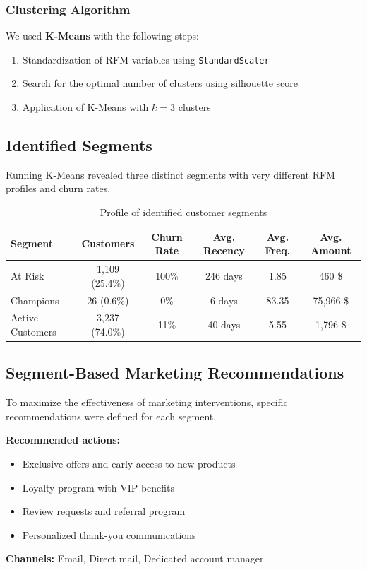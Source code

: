 \documentclass[12pt,a4paper]{article}
\begin{document}
\subsubsection{Clustering Algorithm}
We used \textbf{K-Means} with the following steps:
\begin{enumerate}
    \item Standardization of RFM variables using \texttt{StandardScaler}
    \item Search for the optimal number of clusters using silhouette score
    \item Application of K-Means with $k=3$ clusters
\end{enumerate}

\subsection{Identified Segments}

Running K-Means revealed three distinct segments with very different RFM profiles and churn rates.

\begin{table}[H]
\centering
\begin{tabular}{L{3cm}ccccc}
\toprule
\textbf{Segment} & \textbf{Customers} & \textbf{Churn Rate} & \textbf{Avg. Recency} & \textbf{Avg. Freq.} & \textbf{Avg. Amount} \\
\midrule
At Risk & 1,109 (25.4\%) & 100\% & 246 days & 1.85 & 460 \$ \\
Champions & 26 (0.6\%) & 0\% & 6 days & 83.35 & 75,966 \$ \\
Active Customers & 3,237 (74.0\%) & 11\% & 40 days & 5.55 & 1,796 \$ \\
\bottomrule
\end{tabular}
\caption{Profile of identified customer segments}
\end{table}

\subsection{Segment-Based Marketing Recommendations}

To maximize the effectiveness of marketing interventions, specific recommendations were defined for each segment.

\begin{tcolorbox}[title=Champions Segment (Priority: HIGH VALUE), colback=white, colframe=black]
\textbf{Recommended actions:}
\begin{itemize}
    \item Exclusive offers and early access to new products
    \item Loyalty program with VIP benefits
    \item Review requests and referral program
    \item Personalized thank-you communications
\end{itemize}
\textbf{Channels:} Email, Direct mail, Dedicated account manager
\end{tcolorbox}
\end{document}
